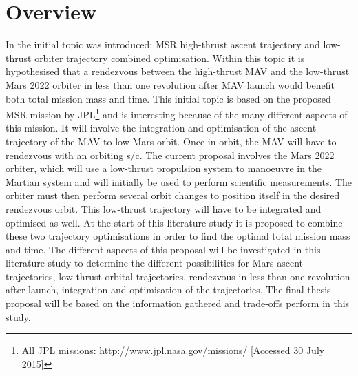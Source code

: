 \chapter{Overview} %
\label{ch:oversub}

In  the initial topic was introduced: \acl{MSR} high-thrust ascent trajectory and low-thrust orbiter trajectory combined optimisation. Within this topic it is hypothesised that a rendezvous between the high-thrust \acf{MAV} and the low-thrust Mars 2022 orbiter in less than one revolution after \ac{MAV} launch would benefit both total mission mass and time. This initial topic is based on the proposed \acf{MSR} mission by \ac{JPL}\footnote{\label{foot:jpl_missions} All \ac{JPL} missions: \url{http://www.jpl.nasa.gov/missions/} [Accessed 30 July 2015]} and is interesting because of the many different aspects of this mission. It will involve the integration and optimisation of the ascent trajectory of the \ac{MAV} to low Mars orbit. Once in orbit, the \ac{MAV} will have to rendezvous with an orbiting \ac{s/c}. The current proposal involves the Mars 2022 orbiter, which will use a low-thrust propulsion system to manoeuvre in the Martian system and will initially be used to perform scientific measurements. The orbiter must then perform several orbit changes to position itself in the desired rendezvous orbit. This low-thrust trajectory will have to be integrated and optimised as well. At the start of this literature study it is proposed to combine these two trajectory optimisations in order to find the optimal total mission mass and time. The different aspects of this proposal will be investigated in this literature study to determine the different possibilities for Mars ascent trajectories, low-thrust orbital trajectories,  rendezvous in less than one revolution after launch, integration and optimisation of the trajectories. The final thesis proposal will be based on the information gathered and trade-offs perform in this study.




